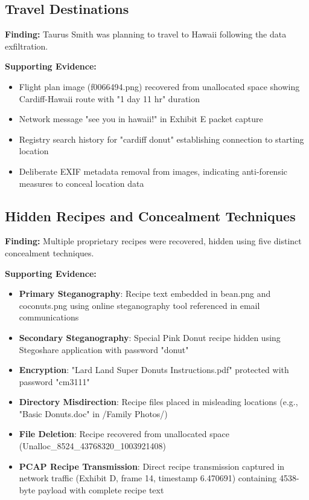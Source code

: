 \subsection{Travel Destinations}
\textbf{Finding:} Taurus Smith was planning to travel to Hawaii following the data exfiltration.

\textbf{Supporting Evidence:}
\begin{itemize}
    \item Flight plan image (f0066494.png) recovered from unallocated space showing Cardiff-Hawaii route with "1 day 11 hr" duration
    \item Network message "see you in hawaii!" in Exhibit E packet capture
    \item Registry search history for "cardiff donut" establishing connection to starting location
    \item Deliberate EXIF metadata removal from images, indicating anti-forensic measures to conceal location data
\end{itemize}

\subsection{Hidden Recipes and Concealment Techniques}
\textbf{Finding:} Multiple proprietary recipes were recovered, hidden using five distinct concealment techniques.

\textbf{Supporting Evidence:}
\begin{itemize}
    \item \textbf{Primary Steganography}: Recipe text embedded in bean.png and coconuts.png using online steganography tool referenced in email communications
    \item \textbf{Secondary Steganography}: Special Pink Donut recipe hidden using Stegoshare application with password "donut"
    \item \textbf{Encryption}: "Lard Land Super Donuts Instructions.pdf" protected with password "cm3111"
    \item \textbf{Directory Misdirection}: Recipe files placed in misleading locations (e.g., "Basic Donuts.doc" in /Family Photos/)
    \item \textbf{File Deletion}: Recipe recovered from unallocated space (Unalloc\_8524\_43768320\_1003921408)
    \item \textbf{PCAP Recipe Transmission}: Direct recipe transmission captured in network traffic (Exhibit D, frame 14, timestamp 6.470691) containing 4538-byte payload with complete recipe text
\end{itemize}

